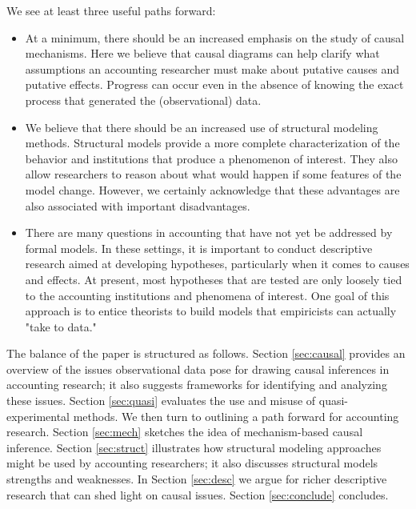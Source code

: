 \documentclass[11pt,reqno,titlepage]{amsart}
\begin{document}
\begin{doublespace}
We see at least three useful paths forward:

\vskip -10pt
\begin{itemize}
\item At a minimum, there should be an increased emphasis on the study of causal mechanisms.
Here we believe that causal diagrams can help clarify what assumptions an accounting researcher must make about putative causes and putative effects. 
Progress can occur even in the absence of knowing the exact process that generated the (observational) data.
\item We believe that there should be an increased use of structural modeling methods. Structural models provide a more complete characterization of the behavior and institutions that produce a phenomenon of interest. They also allow researchers to reason about what would happen if some features of the model change. However, we certainly acknowledge that these advantages are also associated with important disadvantages. 	%
\item There are many questions in accounting that have not yet be addressed by formal models.  In these settings, it is important to conduct descriptive research aimed at developing hypotheses, particularly when it comes to causes and effects. At present, most hypotheses that are tested
are only loosely tied to the accounting institutions and phenomena of interest. One goal of this approach is to entice theorists to build models
that empiricists can actually "take to data."
\end{itemize}

\vskip 10pt
The balance of the paper is structured as follows.
Section \ref{sec:causal} provides an overview of the issues observational data pose for drawing causal inferences in accounting research; 
it also suggests frameworks for identifying and analyzing these issues.
Section \ref{sec:quasi} evaluates the use and misuse of quasi-experimental methods.
We then turn to outlining a path forward for accounting research.
Section \ref{sec:mech} sketches the idea of mechanism-based causal inference.
Section \ref{sec:struct} illustrates how structural modeling approaches might be used by accounting researchers; it also discusses structural models strengths and weaknesses.
In Section \ref{sec:desc} we argue for richer descriptive research that can shed light on causal issues.
Section \ref{sec:conclude} concludes.


\end{doublespace}
\end{document}
